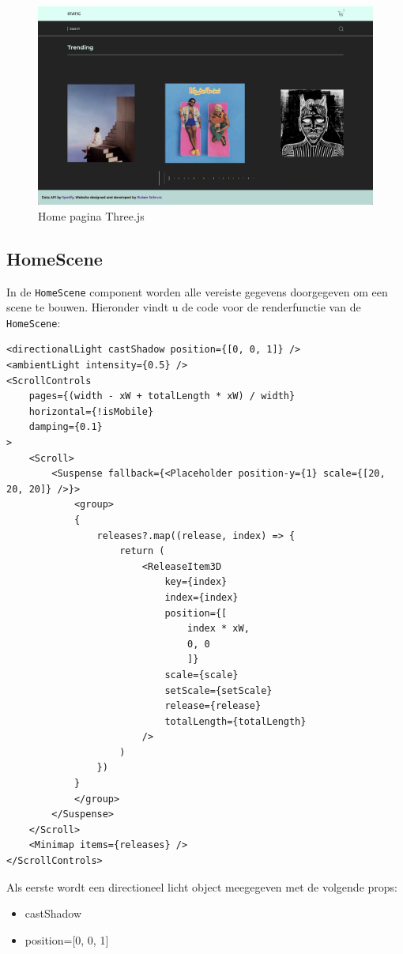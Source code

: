 \begin{figure}
	\centering
	\includegraphics[width=1\linewidth]{graphics/desktopHomeThree}
	\caption[Home pagina Three.js]{Home pagina Three.js}
	\label{fig:desktopHomeThree}
\end{figure}

\newpage
\subsection{HomeScene}

In de \texttt{HomeScene} component worden alle vereiste gegevens doorgegeven om een scene te bouwen. Hieronder vindt u de code voor de renderfunctie van de \texttt{HomeScene}:
\newline
\newline
\begin{BVerbatim}
<directionalLight castShadow position={[0, 0, 1]} />
<ambientLight intensity={0.5} />
<ScrollControls
	pages={(width - xW + totalLength * xW) / width}
	horizontal={!isMobile}
	damping={0.1}
>
	<Scroll>
		<Suspense fallback={<Placeholder position-y={1} scale={[20, 20, 20]} />}>
			<group>
			{
				releases?.map((release, index) => {
					return (
						<ReleaseItem3D
							key={index}
							index={index}
							position={[
								index * xW,
								0, 0
								]}
							scale={scale}
							setScale={setScale}
							release={release}
							totalLength={totalLength}
						/>
					)
				})
			}
			</group>
		</Suspense>
	</Scroll>
	<Minimap items={releases} />
</ScrollControls>
\end{BVerbatim}
\newpage

Als eerste wordt een directioneel licht object meegegeven met de volgende props:

\begin{itemize}
	\item castShadow
	\item position={[0, 0, 1]}
\end{itemize}

